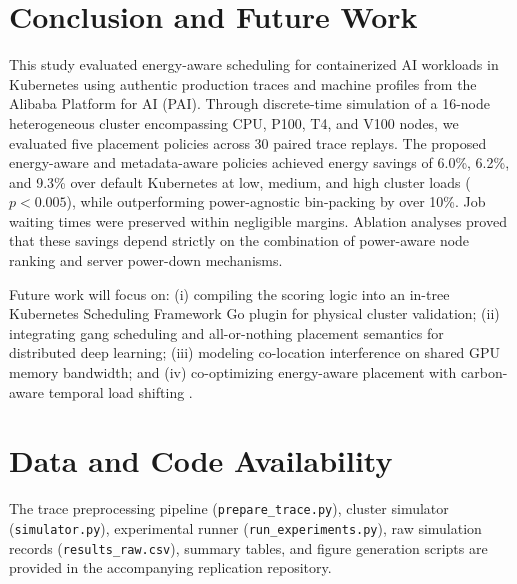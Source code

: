 \documentclass[a4paper,fleqn]{cas-dc}
\begin{document}
\section{Conclusion and Future Work}\label{sec:conclusion}

This study evaluated energy-aware scheduling for containerized AI workloads in Kubernetes using authentic production traces and machine profiles from the Alibaba Platform for AI (PAI). Through discrete-time simulation of a 16-node heterogeneous cluster encompassing CPU, P100, T4, and V100 nodes, we evaluated five placement policies across 30 paired trace replays. The proposed energy-aware and metadata-aware policies achieved energy savings of 6.0\%, 6.2\%, and 9.3\% over default Kubernetes at low, medium, and high cluster loads ($p < 0.005$), while outperforming power-agnostic bin-packing by over 10\%. Job waiting times were preserved within negligible margins. Ablation analyses proved that these savings depend strictly on the combination of power-aware node ranking and server power-down mechanisms.

Future work will focus on: (i) compiling the scoring logic into an in-tree Kubernetes Scheduling Framework Go plugin for physical cluster validation; (ii) integrating gang scheduling and all-or-nothing placement semantics for distributed deep learning; (iii) modeling co-location interference on shared GPU memory bandwidth; and (iv) co-optimizing energy-aware placement with carbon-aware temporal load shifting \citep{piontek2023carbon,gu2025greenflow}.

\section*{Data and Code Availability}
The trace preprocessing pipeline (\texttt{prepare\_trace.py}), cluster simulator (\texttt{simulator.py}), experimental runner (\texttt{run\_experiments.py}), raw simulation records (\texttt{results\_raw.csv}), summary tables, and figure generation scripts are provided in the accompanying replication repository.

\printcredits



\end{document}
